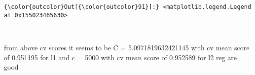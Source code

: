 \documentclass[11pt]{article}
\begin{document}
\begin{Verbatim}[commandchars=\\\{\}]
{\color{outcolor}Out[{\color{outcolor}91}]:} <matplotlib.legend.Legend at 0x155023465630>
\end{Verbatim}
            
    \begin{center}
    \end{center}
    { \hspace*{\fill} \\}
    
    from above cv scores it seems to be C = 5.0971819632421145 with cv mean
score of 0.951195 for l1 and c = 5000 with cv mean score of 0.952589 for
l2 reg are good
\end{document}
